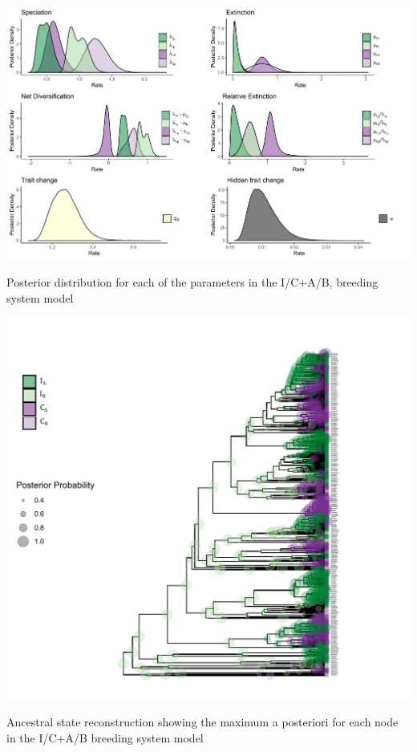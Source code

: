 \begin{suppfigure}
\includegraphics[width=\textwidth]{hisseSInoretposteriordist.pdf}
\caption{Posterior distribution for each of the parameters in the I/C+A/B, breeding system model} %
\label{suppfigure:ICAB}
\end{suppfigure}

\begin{suppfigure}
\includegraphics[width=\textwidth]{asrICAB.pdf}
\caption{Ancestral state reconstruction showing the maximum a posteriori for each node in the I/C+A/B breeding system model} %
\label{suppfigure:ICABasr}
\end{suppfigure}

